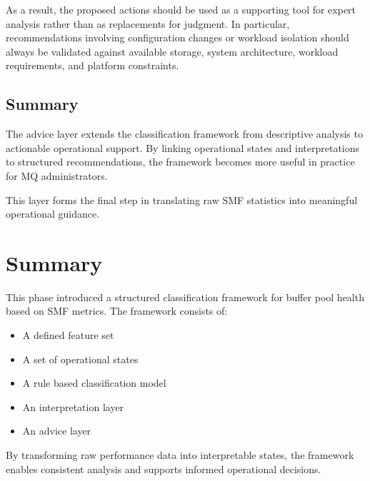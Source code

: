 As a result, the proposed actions should be used as a supporting tool for expert analysis rather than as replacements for judgment. In particular, recommendations involving configuration changes or workload isolation should always be validated against available storage, system architecture, workload requirements, and platform constraints.

\subsection{Summary}

The advice layer extends the classification framework from descriptive analysis to actionable operational support. By linking operational states and interpretations to structured recommendations, the framework becomes more useful in practice for MQ administrators.

This layer forms the final step in translating raw SMF statistics into meaningful operational guidance.

\section{Summary}

This phase introduced a structured classification framework for buffer pool health based on SMF metrics. The framework consists of:

\begin{itemize}
    \item A defined feature set
    \item A set of operational states
    \item A rule based classification model
    \item An interpretation layer
    \item An advice layer
\end{itemize}

By transforming raw performance data into interpretable states, the framework enables consistent analysis and supports informed operational decisions. 

